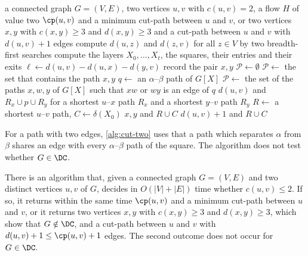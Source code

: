 \begin{algorithm}[tb]
\caption{A minimum cut-path if $c(u, v) = 2$, or two vertices that show $G \notin \DC$}
\label{alg:cut-two}
\begin{algorithmic}[1]
\Require a connected graph $G = (V, E)$, two vertices $u, v$ with $c(u, v) = 2$, a flow $H$ of value two
\Ensure $\cp(u, v)$ and a minimum cut-path between $u$ and $v$, or two vertices $x, y$ with $c(x, y) \geq 3$ and $d(x, y) \geq 3$ and a cut-path between $u$ and $v$ with $d(u, v) + 1$ edges
\State compute $d(u, z)$ and $d(z, v)$ for all $z \in V$ by two breadth-first searches \label{line:bfs}
\State compute the layers $X_0, \dots, X_t$, the squares, their entries and their exits \label{line:pieces}
 \label{line:loop}
    \State $\ell \gets d(u, v) - d(u, x) - d(y, v)$ \label{line:length}
        \State record the pair $x, y$  \label{line:record}
    \EndIf
    \State $\mathcal{P} \gets \emptyset$
        \State $\mathcal{P} \gets$ the set that contains the path $x, y$ \label{line:edge}
        \State $q \gets$ an $\alpha$--$\beta$ path of $G[X]$ \label{line:q}
        \State $\mathcal{P} \gets$ the set of the paths $x, w, y$ of $G[X]$ such that $xw$ or $wy$ is an edge of $q$ \label{line:candidates}
    \EndIf
         \label{line:test}
            \State \Return $d(u, v)$ and $R_x \cup p \cup R_y$ for a shortest $u$--$x$ path $R_x$ and a shortest $y$--$v$ path $R_y$ \label{line:found}
        \EndIf
    \EndFor
\EndFor
\State $R \gets$ a shortest $u$--$v$ path, $C \gets \delta(X_0)$ \label{line:union}
    \State \Return $x, y$ and $R \cup C$ \label{line:certificate}
\EndIf
\State \Return $d(u, v) + 1$ and $R \cup C$ \label{line:not-found}
\end{algorithmic}
\end{algorithm}

For a path with two edges, \cref{alg:cut-two} uses that a path which separates $\alpha$ from $\beta$ shares an edge with every $\alpha$--$\beta$ path of the square.
The algorithm does not test whether $G \in \DC$.

\begin{theorem}
\label{thm:linear-time}
There is an algorithm that, given a connected graph $G = (V, E)$ and two distinct vertices $u, v$ of $G$, decides in $O(|V| + |E|)$ time whether $c(u, v) \leq 2$.
If so, it returns within the same time $\cp(u, v)$ and a minimum cut-path between $u$ and $v$, or it returns two vertices $x, y$ with $c(x, y) \geq 3$ and $d(x, y) \geq 3$, which show that $G \notin \DC$, and a cut-path between $u$ and $v$ with $d(u, v) + 1 \leq \cp(u, v) + 1$ edges.
The second outcome does not occur for $G \in \DC$.
\end{theorem}

